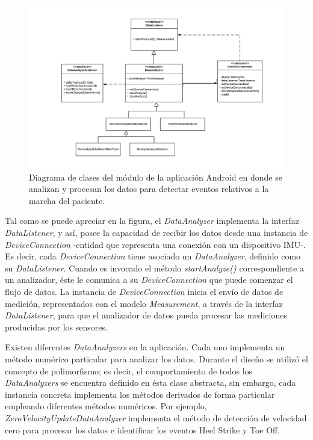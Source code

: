 \begin{figure}[H]
    \hspace*{-3.0cm}%
    \includegraphics[clip,width=1.3 \columnwidth]{TESIS/imagenes/chap05/data-analyzers-class-diagram.png}    
    \caption{Diagrama de clases del módulo de la aplicación Android en donde se analizan y procesan los datos para detectar eventos relativos a la marcha del paciente.}
    \label{FIG:data-analyzer-class-diagram}
\end{figure}

Tal como se puede apreciar en la figura, el \textit{DataAnalyzer} implementa la interfaz \textit{DataListener}, y así, posee la capacidad de recibir los datos desde una instancia de \textit{DeviceConnection} -entidad que representa una conexión con un dispositivo IMU-. Es decir, cada \textit{DeviceConnection} tiene asociado un \textit{DataAnalyzer}, definido como su \textit{DataListener}. Cuando es invocado el método \textit{startAnalyze()} correspondiente a un analizador, éste le comunica a su \textit{DeviceConnection} que puede comenzar el flujo de datos. La instancia de \textit{DeviceConnection} inicia el envío de datos de medición, representados con el modelo \textit{Measurement}, a través de la interfaz \textit{DataListener}, para que el analizador de datos pueda procesar las mediciones producidas por los sensores. 

Existen diferentes \textit{DataAnalyzers} en la aplicación. Cada uno implementa un método numérico particular para analizar los datos. Durante el diseño se utilizó el concepto de polimorfismo; es decir, el comportamiento de todos los \textit{DataAnalyzers} se encuentra definido en ésta clase abstracta, sin embargo, cada instancia concreta implementa los métodos derivados de forma particular empleando diferentes métodos numéricos. Por ejemplo, \textit{ZeroVelocityUpdateDataAnalyzer} implementa el método de detección de velocidad cero para procesar los datos e identificar los eventos Heel Strike y Toe Off. 

